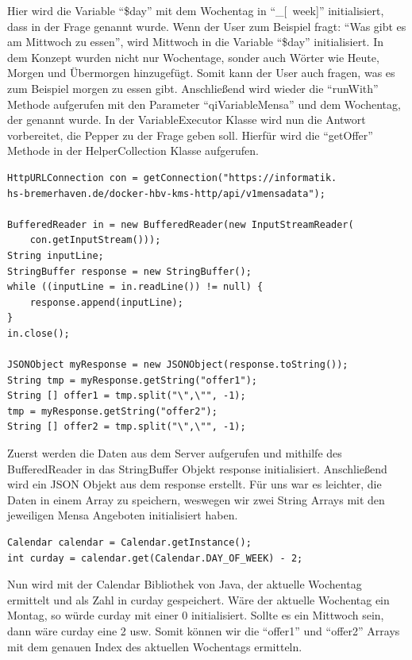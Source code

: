 Hier wird die Variable ``\$day'' mit dem Wochentag in  ``\_[~week]'' initialisiert, dass in der Frage genannt wurde. Wenn der User 
zum Beispiel fragt: ``Was gibt es am Mittwoch zu essen'', wird Mittwoch in die Variable ``\$day'' initialisiert. In dem Konzept 
wurden nicht nur Wochentage, sonder auch Wörter wie Heute, Morgen und Übermorgen hinzugefügt. Somit kann der User auch fragen, was es zum Beispiel 
morgen zu essen gibt. 
Anschließend wird wieder die ``runWith'' Methode aufgerufen mit den Parameter ``qiVariableMensa'' und dem Wochentag, der genannt wurde.
In der VariableExecutor Klasse wird nun die Antwort vorbereitet, die Pepper zu der Frage geben soll. Hierfür wird die ``getOffer'' Methode in 
der HelperCollection Klasse aufgerufen.

\begin{lstlisting}
HttpURLConnection con = getConnection("https://informatik.
hs-bremerhaven.de/docker-hbv-kms-http/api/v1mensadata");

BufferedReader in = new BufferedReader(new InputStreamReader(
    con.getInputStream()));
String inputLine;
StringBuffer response = new StringBuffer();
while ((inputLine = in.readLine()) != null) { 
    response.append(inputLine); 
}
in.close();

JSONObject myResponse = new JSONObject(response.toString());
String tmp = myResponse.getString("offer1");
String [] offer1 = tmp.split("\",\"", -1);
tmp = myResponse.getString("offer2");
String [] offer2 = tmp.split("\",\"", -1); 
\end{lstlisting}

Zuerst werden die Daten aus dem Server aufgerufen und mithilfe des BufferedReader in das StringBuffer Objekt response initialisiert. 
Anschließend wird ein JSON Objekt aus dem response erstellt. Für uns war es leichter, die Daten in einem Array zu speichern, weswegen 
wir zwei String Arrays mit den jeweiligen Mensa Angeboten initialisiert haben.

\begin{lstlisting}
Calendar calendar = Calendar.getInstance();
int curday = calendar.get(Calendar.DAY_OF_WEEK) - 2;    
\end{lstlisting}

Nun wird mit der Calendar Bibliothek von Java, der aktuelle Wochentag ermittelt und als Zahl in curday gespeichert. 
Wäre der aktuelle Wochentag ein Montag, so würde curday mit einer 0 initialisiert. Sollte es ein Mittwoch sein, dann wäre curday eine 
2 usw. 
Somit können wir die ``offer1'' und ``offer2'' Arrays mit dem genauen Index des aktuellen Wochentags ermitteln.

